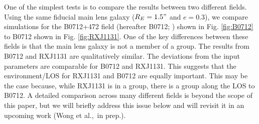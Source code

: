 One of the simplest tests is to compare the results between two different fields. Using the same fiducial main lens galaxy ($R_E = 1.5"$ and $e=0.3$), we compare simulations for the B0712+472 field (hereafter B0712; \citealt{Jackson98}) shown in Fig. \ref{fig:B0712} to B0712 shown in Fig. \ref{fig:RXJ1131}. One of the key differences between these fields is that the main lens galaxy is not a member of a group. The results from B0712 and RXJ1131 are qualitatively similar. The deviations from the input parameters are comparable for B0712 and RXJ1131. This suggests that the environment/LOS for RXJ1131 and B0712 are equally important. This may be the case because, while RXJ1131 is in a group, there is a group along the LOS to B0712. A detailed comparison across many different fields is beyond the scope of this paper, but we will briefly address this issue below and will revisit it in an upcoming work (Wong et al.,~in prep.).
  